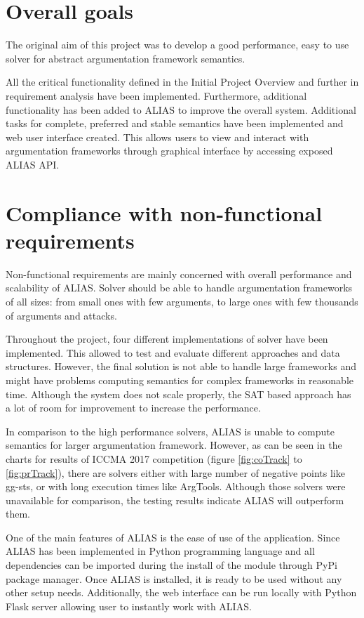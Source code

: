 \section{Overall goals}
The original aim of this project was to develop a good performance, easy to use solver for abstract argumentation framework semantics. 

All the critical functionality defined in the Initial Project Overview and further in requirement analysis have been implemented. Furthermore, additional functionality has been added to ALIAS to improve the overall system. Additional tasks for complete, preferred and stable semantics have been implemented and web user interface created. This allows users to view and interact with argumentation frameworks through graphical interface by accessing exposed ALIAS API.

\section{Compliance with non-functional requirements}
Non-functional requirements are mainly concerned with overall performance and scalability of ALIAS. Solver should be able to handle argumentation frameworks of all sizes: from small ones with few arguments, to large ones with few thousands of arguments and attacks. 

Throughout the project, four different implementations of solver have been implemented. This allowed to test and evaluate different approaches and data structures. However, the final solution is not able to handle large frameworks and might have problems computing semantics for complex frameworks in reasonable time. Although the system does not scale properly, the SAT based approach has a lot of room for improvement to increase the performance. 

In comparison to the high performance solvers, ALIAS is unable to compute semantics for larger argumentation framework. However, as can be seen in the charts for results of ICCMA 2017 competition (figure \ref{fig:coTrack} to \ref{fig:prTrack}), there are solvers either with large number of negative points like gg-sts, or with long execution times like ArgTools. Although those solvers were unavailable for comparison, the testing results indicate ALIAS will outperform them.

One of the main features of ALIAS is the ease of use of the application. Since ALIAS has been implemented in Python programming language and all dependencies can be imported during the install of the module through PyPi package manager. Once ALIAS is installed, it is ready to be used without any other setup needs. Additionally, the web interface can be run locally with Python Flask server allowing user to instantly work with ALIAS.  

